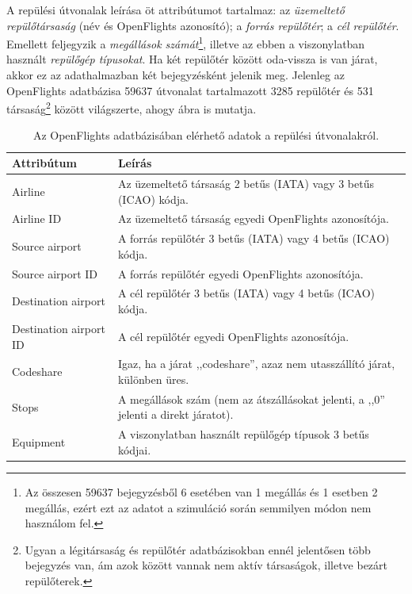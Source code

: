     A repülési útvonalak leírása öt attribútumot tartalmaz: az \textit{üzemeltető repülőtársaság} (név és OpenFlights azonosító); a \textit{forrás repülőtér}; a \textit{cél repülőtér}. Emellett feljegyzik a \textit{megállások számát}\footnote{Az összesen 59637 bejegyzésből 6 esetében van 1 megállás és 1 esetben 2 megállás, ezért ezt az adatot a szimuláció során semmilyen módon nem használom fel.}, illetve az ebben a viszonylatban használt \textit{repülőgép típusokat}. Ha két repülőtér között oda-vissza is van járat, akkor ez az adathalmazban két bejegyzésként jelenik meg. Jelenleg az OpenFlights adatbázisa 59637 útvonalat tartalmazott 3285 repülőtér és 531 társaság\footnote{Ugyan a légitársaság és repülőtér adatbázisokban ennél jelentősen több bejegyzés van, ám azok között vannak nem aktív társaságok, illetve bezárt repülőterek.} között világszerte, ahogy  ábra is mutatja.

    \begin{table}[ht]
      \footnotesize
      \centering
      \begin{tabular}{ | l | l |}
      \hline
      Attribútum & Leírás \\ \hline
      Airline & Az üzemeltető társaság 2 betűs (IATA) vagy 3 betűs (ICAO) kódja.\\
      Airline ID & Az üzemeltető társaság egyedi OpenFlights azonosítója.\\
      Source airport & A forrás repülőtér 3 betűs (IATA) vagy 4 betűs (ICAO) kódja.\\
      Source airport ID & A forrás repülőtér egyedi OpenFlights azonosítója.\\
      Destination airport & A cél repülőtér 3 betűs (IATA) vagy 4 betűs (ICAO) kódja.\\
      Destination airport ID & A cél repülőtér egyedi OpenFlights azonosítója.\\
      Codeshare & Igaz, ha a járat ,,codeshare'', azaz nem utasszállító járat, különben üres.\\
      Stops & A megállások szám (nem az átszállásokat jelenti, a ,,0'' jelenti a direkt járatot).\\
      Equipment & A viszonylatban használt repülőgép típusok 3 betűs kódjai.\\
      \hline
      \end{tabular}
      \caption{Az OpenFlights adatbázisában elérhető adatok a repülési útvonalakról.}
      \label{tab:table_repulesiutvonalak}
    \end{table}

